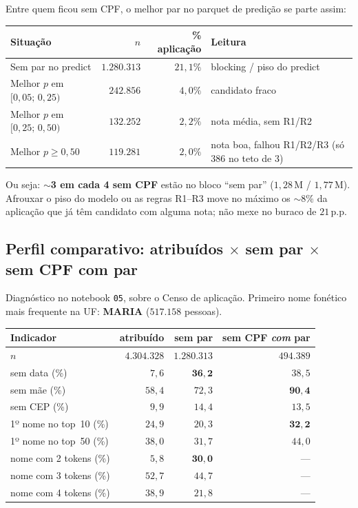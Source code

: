 \documentclass[11pt,a4paper]{article}
\begin{document}
Entre quem ficou sem CPF, o melhor par no parquet de predição se parte assim:

\begin{center}
\begin{tabular}{@{}lrrp{6.2cm}@{}}
\toprule
Situação & $n$ & \% aplicação & Leitura \\
\midrule
Sem par no predict & $1{.}280{.}313$ & $21{,}1\%$ & blocking / piso do predict \\
Melhor $p$ em $[0{,}05;\,0{,}25)$ & $242{.}856$ & $4{,}0\%$ & candidato fraco \\
Melhor $p$ em $[0{,}25;\,0{,}50)$ & $132{.}252$ & $2{,}2\%$ & nota média, sem R1/R2 \\
Melhor $p \ge 0{,}50$ & $119{.}281$ & $2{,}0\%$ & nota boa, falhou R1/R2/R3
  (só 386 no teto de 3) \\
\bottomrule
\end{tabular}
\end{center}

Ou seja: \textbf{$\sim$3 em cada 4 sem CPF} estão no bloco
``sem par'' ($1{,}28$\,M / $1{,}77$\,M). Afrouxar o piso do modelo ou as
regras R1--R3 move no máximo os $\sim$8\% da aplicação que já têm candidato
com alguma nota; não mexe no buraco de $21$\,p.p.

\subsection{Perfil comparativo: atribuídos $\times$ sem par $\times$ sem CPF com par}

Diagnóstico no notebook \texttt{05}, sobre o Censo de aplicação.
Primeiro nome fonético mais frequente na UF: \textbf{MARIA} ($517{.}158$ pessoas).

\begin{center}
\small
\begin{tabular}{@{}lrrr@{}}
\toprule
Indicador & atribuído & sem par & sem CPF \emph{com} par \\
\midrule
$n$ & $4{.}304{.}328$ & $1{.}280{.}313$ & $494{.}389$ \\
sem data (\%) & $7{,}6$ & $\mathbf{36{,}2}$ & $38{,}5$ \\
sem mãe (\%) & $58{,}4$ & $72{,}3$ & $\mathbf{90{,}4}$ \\
sem CEP (\%) & $9{,}9$ & $14{,}4$ & $13{,}5$ \\
1º nome no top~10 (\%) & $24{,}9$ & $20{,}3$ & $\mathbf{32{,}2}$ \\
1º nome no top~50 (\%) & $38{,}0$ & $31{,}7$ & $44{,}0$ \\
nome com 2 tokens (\%) & $5{,}8$ & $\mathbf{30{,}0}$ & --- \\
nome com 3 tokens (\%) & $52{,}7$ & $44{,}7$ & --- \\
nome com 4 tokens (\%) & $38{,}9$ & $21{,}8$ & --- \\
\bottomrule
\end{tabular}
\end{center}
\end{document}
